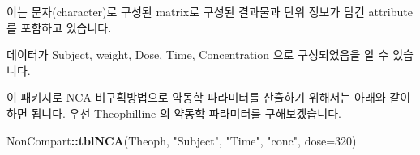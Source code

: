 \documentclass[12pt,]{krantz}
\newenvironment{Shaded}{\begin{snugshade}}{\end{snugshade}}
\newcommand{\KeywordTok}[1]{\textcolor[rgb]{0.13,0.29,0.53}{\textbf{#1}}}
\newcommand{\DataTypeTok}[1]{\textcolor[rgb]{0.13,0.29,0.53}{#1}}
\newcommand{\DecValTok}[1]{\textcolor[rgb]{0.00,0.00,0.81}{#1}}
\newcommand{\StringTok}[1]{\textcolor[rgb]{0.31,0.60,0.02}{#1}}
\newcommand{\OperatorTok}[1]{\textcolor[rgb]{0.81,0.36,0.00}{\textbf{#1}}}
\newcommand{\NormalTok}[1]{#1}
\theoremstyle{definition}
\theoremstyle{definition}
\theoremstyle{definition}
\theoremstyle{remark}
\begin{document}
이는 문자(character)로 구성된 matrix로 구성된 결과물과 단위 정보가 담긴
attribute를 포함하고 있습니다.

데이터가 Subject, weight, Dose, Time, Concentration 으로 구성되었음을 알
수 있습니다.

이 패키지로 NCA 비구획방법으로 약동학 파라미터를 산출하기 위해서는
아래와 같이 하면 됩니다. 우선 Theophilline 의 약동학 파라미터를
구해보겠습니다.

\begin{Shaded}
\begin{Highlighting}[]
\NormalTok{NonCompart}\OperatorTok{::}\KeywordTok{tblNCA}\NormalTok{(Theoph, }\StringTok{"Subject"}\NormalTok{, }\StringTok{"Time"}\NormalTok{, }\StringTok{"conc"}\NormalTok{, }\DataTypeTok{dose=}\DecValTok{320}\NormalTok{)}
\end{Highlighting}
\end{Shaded}
\end{document}
